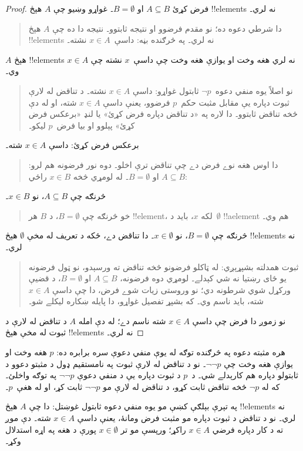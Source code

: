 \documentclass[../../../include/open-logic-section]{subfiles}
\begin{document}
\begin{proof}
  فرض کړئ $A \subseteq B$ او $B = \emptyset$۔ غواړو وښيو چې
  $A$ هېڅ !!{element}s نه لري۔
  \begin{quote}
    دا شرطي دعوه ده؛ نو مقدم فرضوو او نتيجه ثابتوو۔ نتيجه
    دا ده چې $A$ هېڅ !!{element}s نه لري۔ په څرګنده بڼه:
    داسې~$x \in A$ نشته۔
  \end{quote}
  $A$ هېڅ !!{element}s نه لري هغه وخت او يوازې هغه وخت
  چې داسې~$x$ نشته چې $x \in A$ وي۔
  \begin{quote}
    نو اصلاً يوه منفي دعوه~$\lnot p$ ثابتول غواړو: داسې
    $x \in A$ نشته۔ د تناقض له لارې ثبوت دپاره يې مقابل
    مثبت حکم~$p$ فرضوو، يعنې داسې $x \in A$ شته، او
    له دې څخه تناقض ثابتوو۔ دا لاره په «د تناقض دپاره
    فرض کړئ» يا لنډ «برعکس فرض کړئ» پېلوو او بيا
    فرض~$p$ ليکو۔
  \end{quote}
  برعکس فرض کړئ: داسې $x \in A$ شته۔
  \begin{quote}
    دا اوس هغه نوے فرض دے چې تناقض ترې اخلو۔ دوه نور
    فرضونه هم لرو: $A \subseteq B$ او $B = \emptyset$۔
    له لومړي څخه $x \in B$ راځي:
  \end{quote}
  څرنګه چې $A \subseteq B$، نو $x \in B$۔
  \begin{quote}
    خو څرنګه چې $B = \emptyset$، د $B$ هر !!{element}،
    لکه $x$، بايد د~$\emptyset$ !!a{element} هم وي۔
  \end{quote}
  څرنګه چې $B = \emptyset$، نو $x \in \emptyset$۔ دا تناقض
  دے، ځکه د تعريف له مخې $\emptyset$ هېڅ !!{element}s
  نه لري۔
  \begin{quote}
    ثبوت همدلته بشپړېږي: له ټاکلو فرضونو څخه تناقض ته
    ورسېدو، نو ټول فرضونه يو ځای رښتيا نه شي کېدلے۔
    لومړي دوه فرضونه، $A \subseteq B$ او $B = \emptyset$،
    د قضیې ورکړل شوي شرطونه دي؛ نو وروستی زيات شوے فرض،
    دا چې داسې $x \in A$ شته، بايد ناسم وي۔ که بشپړ
    تفصيل غواړو، دا پايله ښکاره ليکلے شو۔
  \end{quote}
  نو زموږ دا فرض چې داسې $x \in A$ شته ناسم دے؛ له دې امله
  $A$ د تناقض له لارې د ثبوت له مخې هېڅ !!{element}s نه لري۔
\end{proof}

هره مثبته دعوه په څرګنده توګه له يوې منفي
دعوې سره برابره ده: $p$ هغه وخت او يوازې هغه وخت چې
$\lnot\lnot p$۔ نو د تناقض له لارې ثبوت په نامستقيم ډول د
مثبتو دعوو د ثابتولو دپاره هم کارېدلے شي۔ د~$p$ د ثبوت
دپاره يې د منفي دعوې $\lnot\lnot p$ په توګه واخلئ۔
که له $\lnot p$ څخه تناقض ثابت کړو، د تناقض له لارې
مو $\lnot\lnot p$ ثابت کړ، او له هغې~$p$۔

په تېرې بېلګې کښې مو يوه منفي دعوه ثابتول غوښتل:
دا چې $A$ هېڅ !!{element}s نه لري۔ نو د تناقض د ثبوت
دپاره مو مثبت فرض ومانۀ، يعنې داسې $x \in A$ شته۔
دې موږ ته د کار دپاره فرضي $x \in A$ راکړ؛ ورپسې مو
تر $x \in \emptyset$ پورې د هغه په اړه استدلال وکړ۔
\end{document}
